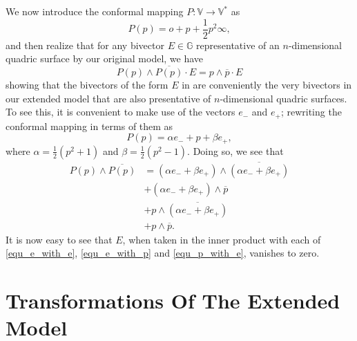 \documentclass{birkjour}
\theoremstyle{definition}
\theoremstyle{remark}
\numberwithin{equation}{section}
\newcommand{\G}{\mathbb{G}}
\newcommand{\V}{\mathbb{V}}
\newcommand{\nvao}{o}
\newcommand{\nvai}{\infty}
\newcommand{\eminus}{e_{-}}
\newcommand{\eplus}{e_{+}}
\begin{document}
We now introduce the conformal mapping $P:\V\to\V^*$ as
\begin{equation}
P(p) = \nvao + p + \frac{1}{2}p^2\nvai,
\end{equation}
and then realize that for any bivector $E\in\G$ representative of an $n$-dimensional
quadric surface by our original model, we have
\begin{equation}
P(p)\wedge\overline{P(p)}\cdot E = p\wedge\overline{p}\cdot E
\end{equation}
showing that the bivectors of the form $E$ in \cite{Parkin12} are 
conveniently the very bivectors in our extended model that are also presentative
of $n$-dimensional quadric surfaces.  To see this, it is convenient
to make use of the vectors $\eminus$ and $\eplus$; rewriting the conformal
mapping in terms of them as
\begin{equation}
P(p) = \alpha\eminus + p + \beta\eplus,
\end{equation}
where $\alpha=\frac{1}{2}(p^2+1)$ and $\beta=\frac{1}{2}(p^2-1)$.
Doing so, we see that
\begin{align}
P(p)\wedge\overline{P(p)}
 &= (\alpha\eminus + \beta\eplus)\wedge\overline{(\alpha\eminus + \beta\eplus)}\label{equ_e_with_e} \\
 &+  (\alpha\eminus + \beta\eplus)\wedge\overline{p}\label{equ_e_with_p} \\
 &+ p\wedge\overline{(\alpha\eminus + \beta\eplus)}\label{equ_p_with_e} \\
 &+ p\wedge\overline{p}.
\end{align}
It is now easy to see that $E$, when taken in the inner product with
each of \eqref{equ_e_with_e}, \eqref{equ_e_with_p} and \eqref{equ_p_with_e}, vanishes to zero.

\section{Transformations Of The Extended Model}
\end{document}
